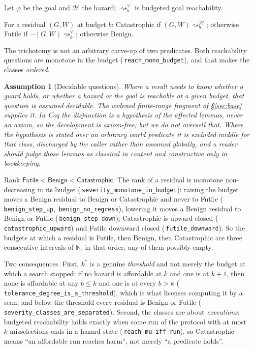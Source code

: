 \documentclass[a4paper,UKenglish,cleveref,autoref,thm-restate,anonymous]{lipics-v2021}
\newtheorem{assumption}[theorem]{Assumption}
\newcommand{\Haz}{\mathcal H}
\newcommand{\reachh}[1]{\rightsquigarrow^{\Haz}_{#1}}
\newcommand{\reachg}[1]{\rightsquigarrow^{\varphi}_{#1}}
\newcommand{\Ben}{\textsf{Benign}}
\newcommand{\Fut}{\textsf{Futile}}
\newcommand{\Cat}{\textsf{Catastrophic}}
\newcommand{\coqok}[1]{\textcolor{okgreen}{\ding{51}}\,\texttt{\small #1}}
\newcommand{\kstar}{k^{*}}
\begin{document}
Let $\varphi$ be the goal and $\Haz$ the hazard; $\reachg{b}$ is budgeted goal
reachability.

\begin{definition}[Severity]\label{def:sev}
For a residual $(G,W)$ at budget $b$: \Cat{} if $(G,W)\reachh{b}$; otherwise
\Fut{} if $\neg(G,W)\reachg{b}$; otherwise \Ben{}.
\end{definition}

The trichotomy is not an arbitrary carve-up of two predicates. Both
reachability questions are monotone in the budget
(\coqok{reach\_mono\_budget}), and that makes the classes \emph{ordered}.

\begin{assumption}[Decidable questions]\label{ass:dec}
Where a result needs to know whether a guard holds, or whether a hazard or the
goal is reachable at a given budget, that question is assumed decidable. The
widened finite-range fragment of \S\ref{sec:base} supplies it. In Coq the
disjunction is a hypothesis of the affected lemmas, never an axiom, so the
development is axiom-free; but we do not oversell that. Where the hypothesis
is stated over an arbitrary world predicate it is excluded middle for that
class, discharged by the caller rather than assumed globally, and a reader
should judge those lemmas as classical in content and constructive only in
bookkeeping.
\end{assumption}

\begin{theorem}\label{thm:ordered}
Rank $\Fut<\Ben<\Cat$. The rank of a residual is monotone non-decreasing in
its budget (\coqok{severity\_monotone\_in\_budget}): raising the budget moves a
\Ben{} residual to \Ben{} or \Cat{} and never to \Fut{}
(\coqok{benign\_step\_up}, \coqok{benign\_no\_regress}), lowering it moves a
\Ben{} residual to \Ben{} or \Fut{} (\coqok{benign\_step\_down}); \Cat{} is
upward closed (\coqok{catastrophic\_upward}) and \Fut{} downward closed
(\coqok{futile\_downward}). So the budgets at which a residual is \Fut, then
\Ben, then \Cat{} are three consecutive intervals of $\mathbb{N}$, in that
order, any of them possibly empty.
\end{theorem}

Two consequences. First, $\kstar$ is a genuine \emph{threshold} and not merely
the budget at which a search stopped: if no hazard is affordable at $k$ and one
is at $k+1$, then none is affordable at any $b\le k$ and one is at every
$b>k$ (\coqok{tolerance\_degree\_is\_a\_threshold}), which is what licenses
computing it by a scan, and below the threshold every residual is \Ben{} or
\Fut{} (\coqok{severity\_classes\_are\_separated}). Second, the classes are
about \emph{executions}: budgeted reachability holds exactly when some run of
the protocol with at most $k$ misselections ends in a hazard state
(\coqok{reach\_mu\_iff\_run}), so \Cat{} means ``an affordable run reaches
harm'', not merely ``a predicate holds''.
\end{document}

